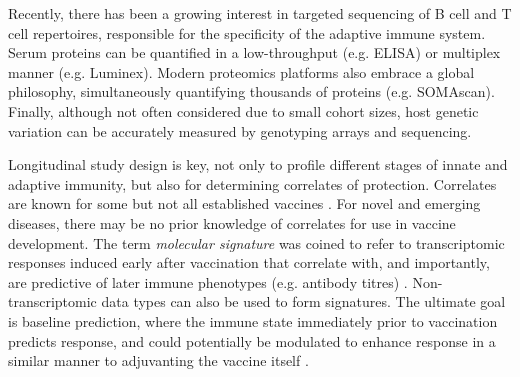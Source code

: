 Recently, there has been a growing interest in targeted sequencing of B cell and T cell repertoires, responsible for the specificity of the adaptive immune system.
Serum proteins can be quantified in a low-throughput (e.g. \gls{ELISA}) or multiplex manner (e.g. Luminex).
Modern proteomics platforms also embrace a global philosophy, simultaneously quantifying thousands of proteins (e.g. SOMAscan). 
Finally, although not often considered due to small cohort sizes, host genetic variation can be accurately measured by genotyping arrays and sequencing. 
%
%

Longitudinal study design is key, not only to profile different stages of innate and adaptive immunity, but also for determining correlates of protection.
Correlates are known for some but not all established vaccines \autocite{siegrist2018VaccineImmunology,plotkin2018CorrelatesProtection}.
For novel and emerging diseases, there may be no prior knowledge of correlates for use in vaccine development.
The term \textit{molecular signature} was coined to refer to transcriptomic responses induced early after vaccination that correlate with, and importantly, are predictive of later immune phenotypes (e.g. antibody titres) \autocite{pulendran2010SystemsVaccinology}.
Non-transcriptomic data types can also be used to form signatures.
The ultimate goal is baseline prediction, where the immune state immediately prior to vaccination predicts response, 
and could potentially be modulated to enhance response in a similar manner to adjuvanting the vaccine itself \autocite{tsang2020ImprovingVaccineinducedImmunity}. 

